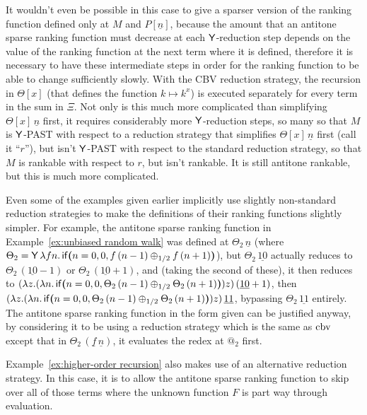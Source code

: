 \begin{example}
It wouldn't even be possible in this case to give a sparser version of the ranking function defined only at $M$ and $P[\underline n]$, because the amount that an antitone sparse ranking function must decrease at each $\mathsf{Y}$-reduction step depends on the value of the ranking function at the next term where it is defined, therefore it is necessary to have these intermediate steps in order for the ranking function to be able to change sufficiently slowly.
With the CBV reduction strategy, the recursion in $\Theta[x]$ (that defines the function $k \mapsto k^x$) is executed separately for every term in the sum in $\Xi$. Not only is this much more complicated than simplifying $\Theta[x] \, \underline n$ first, it requires considerably more $\mathsf{Y}$-reduction steps, so many so that $M$ is $\mathsf{Y}$-PAST with respect to a reduction strategy that simplifies $\Theta[x] \, \underline n$ first (call it ``$r$''), but isn't $\mathsf{Y}$-PAST with respect to the standard reduction strategy, so that $M$ is rankable with respect to $r$, but isn't rankable. It is still antitone rankable, but this is much more complicated. 
\end{example}

\begin{remark}
\label{rem:ex corrected using confluent semantics}
Even some of the examples given earlier implicitly use slightly non-standard reduction strategies to make the definitions of their ranking functions slightly simpler. For example, the antitone sparse ranking function in Example~\ref{ex:unbiased random walk} was defined at $\Theta_2\, \underline n$ (where $\Theta_2 = \mathsf{Y} \, \lambda f n . \, \mathsf{if}\boldsymbol{(}n = 0, 0, f \, (n - 1) \oplus_{1/2} f \, (n + 1)\boldsymbol{)}$), but $\Theta_2\, \underline{10}$ actually reduces to $\Theta_2\, (\underline{10} - 1)$ or $\Theta_2\, (\underline{10} + 1)$, and (taking the second of these), it then reduces to $(\lambda z. (\lambda n. \, \mathsf{if}\boldsymbol{(}n = 0, 0, \Theta_2 \, (n - 1) \oplus_{1/2} \Theta_2 \, (n + 1)\boldsymbol{)}) z) \, (\underline{10} + 1)$, then $(\lambda z. (\lambda n. \, \mathsf{if}\boldsymbol{(}n = 0, 0, \Theta_2 \, (n - 1) \oplus_{1/2} \Theta_2 \, (n + 1)\boldsymbol{)}) z) \, \underline{11}$, bypassing $\Theta_2\, \underline{11}$ entirely. The antitone sparse ranking function in the form given can be justified anyway, by considering it to be using a reduction strategy which is the same as $\operatorname{cbv}$ except that in $\Theta_2\, (\underline f \, \underline n)$, it evaluates the redex at $@_2$ first.

Example~\ref{ex:higher-order recursion} also makes use of an alternative reduction strategy. In this case, it is to allow the antitone sparse ranking function to skip over all of those terms where the unknown function $F$ is part way through evaluation.
\end{remark}
